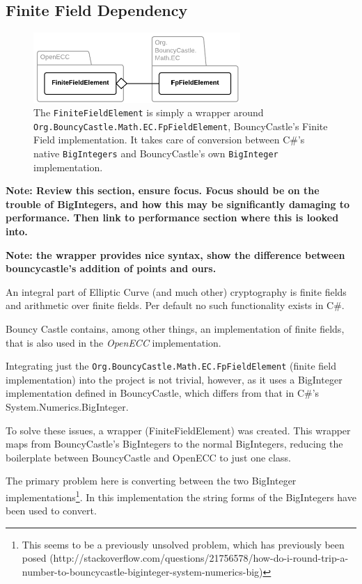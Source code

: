 \subsection{Finite Field Dependency}
\label{sec:implementation__dependencies}
\label{sec:implementation_dependency}

\begin{figure}
	\centering
	\includegraphics[width=0.7\textwidth]{implementation/finitefields}
	\caption{The \texttt{FiniteFieldElement} is simply a wrapper around \texttt{Org.BouncyCastle.Math.EC.FpFieldElement},
		BouncyCastle's Finite Field implementation. It takes care of conversion between C\#'s native \texttt{BigIntegers} and
		BouncyCastle's own \texttt{BigInteger} implementation.}
\end{figure}

\textbf{Note: Review this section, ensure focus. Focus should be on the trouble of BigIntegers, and how
this may be significantly damaging to performance. Then link to performance section where this is looked into.}

\textbf{Note: the wrapper provides nice syntax, show the difference between bouncycastle's addition of points
and ours.}

An integral part of Elliptic Curve (and much other) cryptography is finite fields and arithmetic
over finite fields. Per default no such functionality exists in C\#.

Bouncy Castle contains, among other things, an implementation of finite fields, that is also used
in the \emph{OpenECC} implementation.

Integrating just the \verb+Org.BouncyCastle.Math.EC.FpFieldElement+ (finite field implementation) into
the project is not trivial, however, as it uses a BigInteger implementation defined in BouncyCastle,
which differs from that in C\#'s System.Numerics.BigInteger.

To solve these issues, a wrapper (FiniteFieldElement) was created. This wrapper maps from BouncyCastle's
BigIntegers to the normal BigIntegers, reducing the boilerplate between BouncyCastle and OpenECC to
just one class.

The primary problem here is converting between the two BigInteger implementations\footnote{This seems
to be a previously unsolved problem, which has previously been posed (http://stackoverflow.com/questions/21756578/how-do-i-round-trip-a-number-to-bouncycastle-biginteger-system-numerics-big)}.
In this implementation the string forms of the BigIntegers have been used to convert.

